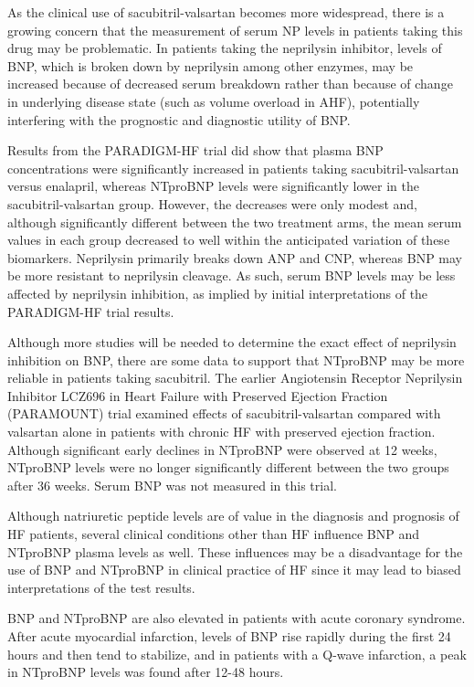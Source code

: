 \documentclass[14pt,a4paper,onecolumn]{extarticle}
\begin{document}
As the clinical use of sacubitril-valsartan becomes more widespread, there is a growing concern that the measurement of serum NP levels in patients taking this drug may be problematic. In patients taking the neprilysin inhibitor, levels of BNP, which is broken down by neprilysin among other enzymes, may be increased because of decreased serum breakdown rather than because of change in underlying disease state (such as volume overload in AHF), potentially interfering with the prognostic and diagnostic utility of BNP.  \citep{Mckie2016} %

Results from the PARADIGM-HF trial did show that plasma BNP concentrations were significantly increased in patients taking sacubitril-valsartan versus enalapril, whereas NTproBNP levels were significantly lower in the sacubitril-valsartan group.  However, the decreases were only modest and, although significantly different between the two treatment arms, the mean serum values in each group decreased to well within the anticipated variation of these biomarkers.  Neprilysin primarily breaks down ANP and CNP, whereas BNP may be more resistant to neprilysin cleavage.  As such, serum BNP levels may be less affected by neprilysin inhibition, as implied by initial interpretations of the PARADIGM-HF trial results. \citep{Maisel2018}

Although more studies will be needed to determine the exact effect of neprilysin inhibition on BNP, there are some data to support that NTproBNP may be more reliable in patients taking sacubitril.  The earlier Angiotensin Receptor Neprilysin Inhibitor LCZ696 in Heart Failure with Preserved Ejection Fraction (PARAMOUNT) trial examined effects of sacubitril-valsartan compared with valsartan alone in patients with chronic HF with preserved ejection fraction. Although significant early declines in NTproBNP were observed at 12 weeks, NTproBNP levels were no longer significantly different between the two groups after 36 weeks. Serum BNP was not measured in this trial.  \citep{Maisel2018}

Although natriuretic peptide levels are of value in the diagnosis and prognosis of HF patients, several clinical conditions other than HF influence BNP and NTproBNP plasma levels as well. These influences may be a disadvantage for the use of BNP and NTproBNP in clinical practice of HF since it may lead to biased interpretations of the test results.

BNP and NTproBNP are also elevated in patients with acute coronary syndrome. After acute myocardial infarction, levels of BNP rise rapidly during the first 24 hours and then tend to stabilize, \citep{deLemos2001} and in patients with a Q-wave infarction, a peak in NTproBNP levels was found after 12-48 hours. \citep{Talwar2000}
\end{document}
